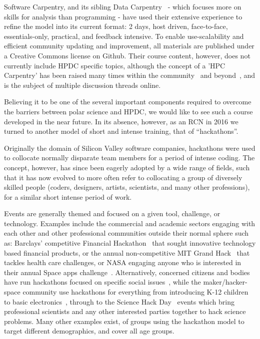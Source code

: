 \documentclass[conference]{IEEEtran}
\begin{document}
Software Carpentry, and its sibling Data Carpentry~\cite{Mimno2016-cw} - which focuses more on skills for analysis than programming - have used their extensive experience to refine the model into its current format: 2 days, host driven, face-to-face, essentials-only, practical, and feedback intensive. To enable use-scalability and efficient community updating and improvement, all materials are published under a Creative Commons license on Github. Their course content, however, does not currently include HPDC specific topics, although the concept of a 'HPC Carpentry' has been raised many times within the community~\cite{Datacarpentry_undated-zl} and beyond~\cite{noauthor_undated-zw}, and is the subject of multiple discussion threads online. 

Believing it to be one of the several important components required to overcome the barriers between polar science and HPDC, we would like to see such a course developed in the near future. In its absence, however, as an RCN in 2016 we turned to another model of short and intense training, that of ``hackathons''. 

Originally the domain of Silicon Valley software companies, hackathons were used to collocate normally disparate team members for a period of intense coding. The concept, however, has since been eagerly adopted by a wide range of fields, such that it has now evolved to more often refer to collocating a group of diversely skilled people (coders, designers, artists, scientists, and many other professions), for a similar short intense period of work.  

Events are generally themed and focused on a given tool, challenge, or technology. Examples include the commercial and academic sectors engaging with each other and other professional communities outside their normal sphere such as: Barclays' competitive Financial Hackathon~\cite{noauthor_undated-rc} that sought innovative technology based financial products, or the annual non-competitive MIT Grand Hack~\cite{noauthor_undated-zx} that tackles health care challenges, or NASA engaging anyone who is interested in their annual Space apps challenge~\cite{noauthor_undated-rb}.  Alternatively, concerned citizens and bodies have run hackathons focused on specific social issues~\cite{noauthor_undated-qo,noauthor_undated-vs}, while the maker/hacker-space community use hackathons for everything from introducing K-12 children to basic electronics~\cite{Aboab2016-tk}, through to the Science Hack Day~\cite{noauthor_undated-qs} events which bring professional scientists and any other interested parties together to hack science problems.  Many other examples exist, of groups using the hackathon model to target different demographics, and cover all age groups.  
\end{document}
